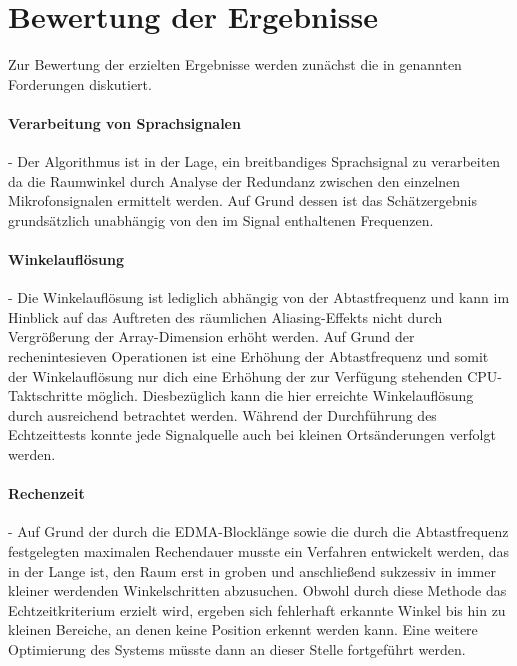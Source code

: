 \section{Bewertung der Ergebnisse}
\label{sec:BewertungErgebnisse}
Zur Bewertung der erzielten Ergebnisse werden zunächst die in  genannten Forderungen diskutiert.


\paragraph{Verarbeitung von Sprachsignalen} - Der Algorithmus ist in der Lage, ein breitbandiges Sprachsignal zu verarbeiten da die Raumwinkel durch Analyse der Redundanz zwischen den einzelnen Mikrofonsignalen ermittelt werden. Auf Grund dessen ist das Schätzergebnis grundsätzlich unabhängig von den im Signal enthaltenen Frequenzen.


\paragraph{Winkelauflösung} - Die Winkelauflösung ist lediglich abhängig von der Abtastfrequenz und kann im Hinblick auf das Auftreten des räumlichen Aliasing-Effekts nicht durch Vergrößerung der Array-Dimension erhöht werden. Auf Grund der rechenintesieven Operationen ist eine Erhöhung der Abtastfrequenz und somit der Winkelauflösung nur dich eine Erhöhung der zur Verfügung stehenden CPU-Taktschritte möglich. Diesbezüglich kann die hier erreichte Winkelauflösung durch ausreichend betrachtet werden. Während der Durchführung des Echtzeittests konnte jede Signalquelle auch bei kleinen Ortsänderungen verfolgt werden.  


\paragraph{Rechenzeit} - Auf Grund der durch die EDMA-Blocklänge sowie die durch die Abtastfrequenz festgelegten maximalen Rechendauer musste ein Verfahren entwickelt werden, das in der Lange ist, den Raum erst in groben und anschließend sukzessiv in immer kleiner werdenden Winkelschritten abzusuchen. Obwohl durch diese Methode das Echtzeitkriterium erzielt wird, ergeben sich fehlerhaft erkannte Winkel bis hin zu kleinen Bereiche, an denen keine Position erkennt werden kann. Eine weitere Optimierung des Systems müsste dann an dieser Stelle fortgeführt werden.


